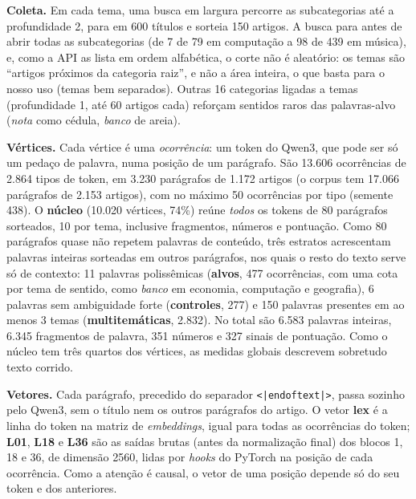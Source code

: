 \documentclass[11pt,a4paper]{article}
\begin{document}
\textbf{Coleta.} Em cada tema, uma busca em largura percorre as subcategorias até a
profundidade 2, para em 600 títulos e sorteia 150 artigos. A busca para antes de abrir todas
as subcategorias (de 7 de 79 em computação a 98 de 439 em música), e, como a API as lista em
ordem alfabética, o corte não é aleatório: os temas são ``artigos próximos da categoria
raiz'', e não a área inteira, o que basta para o nosso uso (temas bem separados). Outras 16 categorias ligadas a temas
(profundidade 1, até 60 artigos cada) reforçam sentidos raros das palavras-alvo
(\textit{nota} como cédula, \textit{banco} de areia).

\textbf{Vértices.} Cada vértice é uma \textit{ocorrência}: um token do Qwen3, que pode ser só
um pedaço de palavra, numa posição de um parágrafo. São 13.606 ocorrências de 2.864 tipos de
token, em 3.230 parágrafos de 1.172 artigos (o corpus tem 17.066 parágrafos de 2.153
artigos), com no máximo 50 ocorrências por tipo (semente 438). O \textbf{núcleo} (10.020
vértices, 74\%) reúne \emph{todos} os tokens de 80 parágrafos sorteados, 10 por tema,
inclusive fragmentos, números e pontuação. Como 80 parágrafos quase não repetem palavras de
conteúdo, três estratos acrescentam palavras inteiras sorteadas em outros parágrafos, nos
quais o resto do texto serve só de contexto: 11 palavras polissêmicas (\textbf{alvos}, 477
ocorrências, com uma cota por tema de sentido, como \textit{banco} em economia, computação e
geografia), 6 palavras sem ambiguidade forte (\textbf{controles}, 277) e 150 palavras
presentes em ao menos 3 temas (\textbf{multitemáticas}, 2.832). No total são 6.583 palavras
inteiras, 6.345 fragmentos de palavra, 351 números e 327 sinais de pontuação. Como o núcleo
tem três quartos dos vértices, as medidas globais descrevem sobretudo texto corrido.

\textbf{Vetores.} Cada parágrafo, precedido do separador \texttt{<|endoftext|>}, passa
sozinho pelo Qwen3, sem o título nem os outros parágrafos do artigo. O vetor \textbf{lex} é a
linha do token na matriz de \textit{embeddings}, igual para todas as ocorrências do token;
\textbf{L01}, \textbf{L18} e \textbf{L36} são as saídas brutas (antes da normalização final)
dos blocos 1, 18 e 36, de dimensão 2560, lidas por \textit{hooks} do PyTorch na posição de
cada ocorrência. Como a atenção é causal, o vetor de uma posição depende só do seu token e
dos anteriores.
\end{document}
